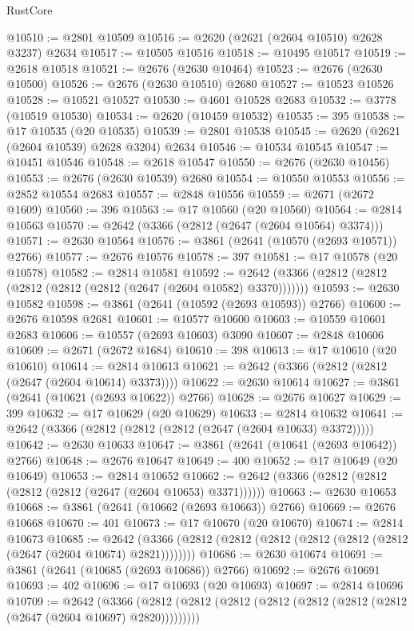 \begin{lexlean}{RustCore}
\begin{coremodule}
@10510 := @2801 @10509
@10516 := @2620 (@2621 (@2604 @10510) @2628 @3237) @2634
@10517 := @10505 @10516
@10518 := @10495 @10517
@10519 := @2618 @10518
@10521 := @2676 (@2630 @10464)
@10523 := @2676 (@2630 @10500)
@10526 := @2676 (@2630 @10510) @2680
@10527 := @10523 @10526
@10528 := @10521 @10527
@10530 := @4601 @10528 @2683
@10532 := @3778 (@10519 @10530)
@10534 := @2620 (@10459 @10532)
@10535 := 395
@10538 := @17 @10535 (@20 @10535)
@10539 := @2801 @10538
@10545 := @2620 (@2621 (@2604 @10539) @2628 @3204) @2634
@10546 := @10534 @10545
@10547 := @10451 @10546
@10548 := @2618 @10547
@10550 := @2676 (@2630 @10456)
@10553 := @2676 (@2630 @10539) @2680
@10554 := @10550 @10553
@10556 := @2852 @10554 @2683
@10557 := @2848 @10556
@10559 := @2671 (@2672 @1609)
@10560 := 396
@10563 := @17 @10560 (@20 @10560)
@10564 := @2814 @10563
@10570 := @2642 (@3366 (@2812 (@2647 (@2604 @10564) @3374)))
@10571 := @2630 @10564
@10576 := @3861 (@2641 (@10570 (@2693 @10571)) @2766)
@10577 := @2676 @10576
@10578 := 397
@10581 := @17 @10578 (@20 @10578)
@10582 := @2814 @10581
@10592 := @2642 (@3366 (@2812 (@2812 (@2812 (@2812 (@2812 (@2647 (@2604 @10582) @3370)))))))
@10593 := @2630 @10582
@10598 := @3861 (@2641 (@10592 (@2693 @10593)) @2766)
@10600 := @2676 @10598 @2681
@10601 := @10577 @10600
@10603 := @10559 @10601 @2683
@10606 := @10557 (@2693 @10603) @3090
@10607 := @2848 @10606
@10609 := @2671 (@2672 @1684)
@10610 := 398
@10613 := @17 @10610 (@20 @10610)
@10614 := @2814 @10613
@10621 := @2642 (@3366 (@2812 (@2812 (@2647 (@2604 @10614) @3373))))
@10622 := @2630 @10614
@10627 := @3861 (@2641 (@10621 (@2693 @10622)) @2766)
@10628 := @2676 @10627
@10629 := 399
@10632 := @17 @10629 (@20 @10629)
@10633 := @2814 @10632
@10641 := @2642 (@3366 (@2812 (@2812 (@2812 (@2647 (@2604 @10633) @3372)))))
@10642 := @2630 @10633
@10647 := @3861 (@2641 (@10641 (@2693 @10642)) @2766)
@10648 := @2676 @10647
@10649 := 400
@10652 := @17 @10649 (@20 @10649)
@10653 := @2814 @10652
@10662 := @2642 (@3366 (@2812 (@2812 (@2812 (@2812 (@2647 (@2604 @10653) @3371))))))
@10663 := @2630 @10653
@10668 := @3861 (@2641 (@10662 (@2693 @10663)) @2766)
@10669 := @2676 @10668
@10670 := 401
@10673 := @17 @10670 (@20 @10670)
@10674 := @2814 @10673
@10685 := @2642 (@3366 (@2812 (@2812 (@2812 (@2812 (@2812 (@2812 (@2647 (@2604 @10674) @2821))))))))
@10686 := @2630 @10674
@10691 := @3861 (@2641 (@10685 (@2693 @10686)) @2766)
@10692 := @2676 @10691
@10693 := 402
@10696 := @17 @10693 (@20 @10693)
@10697 := @2814 @10696
@10709 := @2642
    (@3366 (@2812 (@2812 (@2812 (@2812 (@2812 (@2812 (@2812 (@2647 (@2604 @10697) @2820)))))))))

\end{coremodule}
\end{lexlean}

